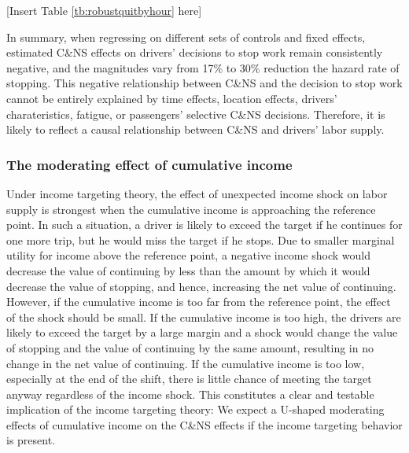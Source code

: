 \documentclass[reviewmode]{restat}
\begin{document}


\begin{center}
	[Insert Table \ref{tb:robustquitbyhour} here]
\end{center}


In summary, when regressing on different sets of controls and fixed effects, estimated C\&NS effects on
drivers' decisions to stop work remain consistently negative, and the magnitudes vary
from 17\% to 30\% reduction the hazard rate of stopping. This negative relationship between C\&NS and the decision to stop work cannot
be entirely explained by time effects, location effects, drivers' charateristics, fatigue, or passengers' 
selective C\&NS decisions. Therefore, it is likely to reflect a causal relationship between C\&NS and 
drivers' labor supply.


\subsubsection{The moderating effect of cumulative income} Under income targeting theory, the effect of unexpected income shock on labor supply is strongest when the cumulative income is approaching the reference point. In such a situation, a driver is likely to exceed the target if he continues for one more trip, but he would miss the target if he stops. Due to smaller marginal utility for income above the reference point, a negative income shock would decrease the value of continuing by less than the amount by which it would decrease the value of stopping, and hence, increasing the net value of continuing. However, if the cumulative income is too far from the reference point, the effect of the shock should be small. If the cumulative income is too high, the drivers are likely to exceed the target by a large margin and a shock would change the value of stopping and the value of continuing by the same amount, resulting in no change in the net value of continuing. If the cumulative income is too low, especially at the end of the shift, there is little chance of meeting the target anyway regardless of the income shock. This constitutes a clear and testable implication of the income targeting theory: We expect a U-shaped moderating effects of cumulative income on the C\&NS effects if the income targeting behavior is present.
\end{document}
